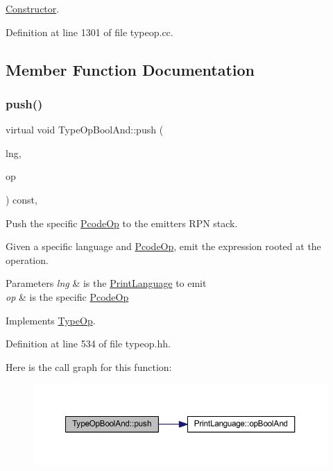 \mbox{\hyperlink{class_constructor}{Constructor}}. 



Definition at line 1301 of file typeop.\+cc.



\subsection{Member Function Documentation}
\mbox{\label{class_type_op_bool_and_ae753bfa4e640a78b897f4d92fb41afe6}} 
\subsubsection{\texorpdfstring{push()}{push()}}
{\footnotesize\ttfamily virtual void Type\+Op\+Bool\+And\+::push (\begin{DoxyParamCaption}\item[{\mbox{\hyperlink{class_print_language}{Print\+Language}} $\ast$}]{lng,  }\item[{const \mbox{\hyperlink{class_pcode_op}{Pcode\+Op}} $\ast$}]{op }\end{DoxyParamCaption}) const\hspace{0.3cm}{\ttfamily [inline]}, {\ttfamily [virtual]}}



Push the specific \mbox{\hyperlink{class_pcode_op}{Pcode\+Op}} to the emitter\textquotesingle{}s R\+PN stack. 

Given a specific language and \mbox{\hyperlink{class_pcode_op}{Pcode\+Op}}, emit the expression rooted at the operation. 
\begin{DoxyParams}{Parameters}
{\em lng} & is the \mbox{\hyperlink{class_print_language}{Print\+Language}} to emit \\
\hline
{\em op} & is the specific \mbox{\hyperlink{class_pcode_op}{Pcode\+Op}} \\
\hline
\end{DoxyParams}


Implements \mbox{\hyperlink{class_type_op_ac9c9544203ed74dabe6ac662b653b2af}{Type\+Op}}.



Definition at line 534 of file typeop.\+hh.

Here is the call graph for this function\+:
\nopagebreak
\begin{figure}[H]
\begin{center}
\leavevmode
\includegraphics[width=350pt]{class_type_op_bool_and_ae753bfa4e640a78b897f4d92fb41afe6_cgraph}
\end{center}
\end{figure}


